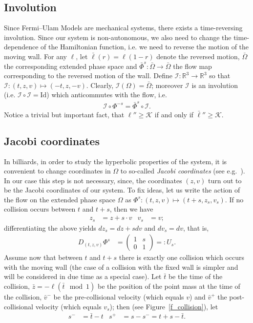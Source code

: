 \documentclass[AHL, Unicode, longabstracts,published]{cedram}
\newcommand{\ct}{r}
\newcommand{\deh}{\mathrm{d}}
\newcommand{\bR}{\mathbb{R}}
\newcommand{\cK}{\mathcal{K}}
\newcommand{\cI}{\mathcal{I}}
\newcommand{\matrixtt}[4]{\left(
\begin{array}{cc}#1&#2\\#3&#4
\end{array}\right)}
\newcommand{\exph}{\Omega}
\newcommand{\invo}{\cI}
\newcommand{\flow}[1]{\Phi^{#1}}
\newcommand{\rflow}[1]{\bar\Phi^{#1}}
\newcommand{\rell}{\bar\ell}
\newcommand{\ppPrivate}[2]{#1^{#2}}
\newcommand{\prePrivate}[1]{\ppPrivate{#1}{-}}
\newcommand{\postPrivate}[1]{\ppPrivate{#1}{+}}
\newcommand{\prv}{\prePrivate{\bar v}}
\newcommand{\pov}{\postPrivate{\bar v}}
\newcommand{\prs}{\prePrivate{s}}
\newcommand{\pos}{\postPrivate{s}}
\renewcommand{\deh}{d}
\newcommand{\Id}{\mathrm{Id}}
\begin{document}
\subsection{Involution}\label{SSInvolution}
Since Fermi--Ulam Models are mechanical systems, there exists a time-{}reversing involution. Since our system is non-autonomous, we also need to change the time-dependence of the Hamiltonian function, i.e. we need to reverse the motion of the moving wall. For any $\ell$, let $\rell(\ct)=\ell(1-\ct)$ denote the reversed motion, $\bar\exph$ the corresponding extended phase space and $\rflow{s}:\bar\exph\to\bar\exph$ the flow map corresponding to the reversed motion of the wall. Define $\invo:\bR^3\to\bR^3$ so that $\invo:(t,z,v)\mapsto(-t,z,-v)$. Clearly, $\invo(\exph)=\bar\exph$; moreover $\invo$ is an involution (i.e. $\invo\circ\invo = \Id$) which anticommutes with the flow, i.e.
\begin{align*}
\invo\circ\flow{-s} = \rflow{s}\circ\invo.
\end{align*}
Notice a trivial but important fact, that $\ell''\geq\cK$ if and only if ${\bar\ell}''\geq\cK$.

\subsection{Jacobi coordinates} 

In billiards, in order to study the hyperbolic properties of the system, it is convenient to change coordinates in $\exph$ to so-called
\emph{Jacobi coordinates} (see e.g.~\cite{Wojt}). In our case this step is not necessary, since, the coordinates $(z,v)$ turn out to be the Jacobi coordinates of our system. To fix ideas, let us write the action of the flow on the extended phase space $\exph$ as \(\flow{s}:(t,z,v)\mapsto(t+s,z_s,v_s).\) If no collision occurs between $t$ and $t+s$, then we have
\begin{align}\label{e_freeFlight}
z_s&=z+s\cdot v& v_s&=v;
\end{align}
differentiating the above yields $\deh z_s = \deh z + s\deh v$ and $\deh v_s = \deh v$, that is,
\begin{align*}
D_{(t,z,v)}\flow{s}&=\matrixtt{1}{s}{0}{1}=:U_s.
\end{align*}
Assume now that between $t$ and $t+s$ there is exactly one collision which occurs with the moving wall (the case of a collision with the fixed wall is simpler and will be considered in due time as a special case). Let $\bar t$ be the time of the collision, $\bar z=-\ell(\bar t \mod 1)$ be the position of the point mass at the time of the collision, $\prv$ be the pre-collisional velocity (which equals $v$) and $\pov$ the post-collisional velocity (which equals $v_{s}$); then (see Figure~\ref{f_collision}), let
\begin{align}\label{eq:prs=bar-t-tpos=s}
\prs&=\bar t-t&\pos&=s-\prs=t+s-\bar t.
\end{align}
\end{document}
